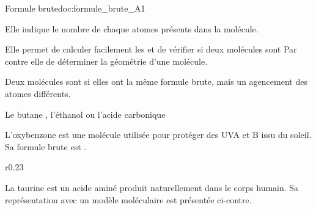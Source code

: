 %



\vspace*{-12pt}

\vspace*{-8pt}
\begin{doc}{Formule brute}{doc:formule_brute_A1}
  \begin{importants}
    Elle indique le nombre de chaque atomes présents dans la molécule.
  \end{importants}
  Elle permet de calculer facilement les  et de vérifier si deux molécules sont 
  Par contre elle  de déterminer la géométrie d'une molécule.

  \begin{importants}
    Deux molécules sont  si elles ont la même formule brute, mais un agencement des atomes différents.
  \end{importants}

  \exemple Le butane , l'éthanol  ou l'acide carbonique 
\end{doc}

L'oxybenzone est une molécule utilisée pour protéger des UVA et B issu du soleil.
Sa formule brute est  .


\vspace*{8pt}
\begin{wrapfigure}[2]{r}{0.23\linewidth}
  \centering
  \vspace*{-22pt}
\end{wrapfigure}

La taurine est un acide aminé produit naturellement dans le corps humain.
Sa représentation avec un modèle moléculaire est présentée ci-contre.

